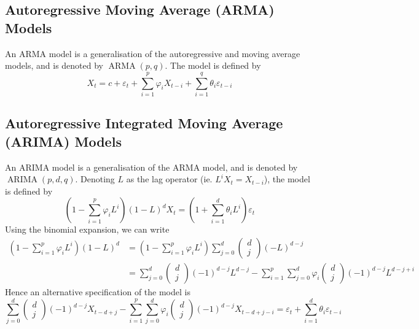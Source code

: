 \documentclass[11pt]{report} %
\begin{document}
\subsection{Autoregressive Moving Average (ARMA) Models}
An ARMA model is a generalisation of the autoregressive and moving average models, and is denoted by $\operatorname{ARMA}\left(p, q\right)$. The model is defined by
\begin{equation}
X_{t} = c + \varepsilon_{t} + \sum_{i = 1}^{p}\varphi_{i}X_{t - i} + \sum_{i = 1}^{q}\theta_{i}\varepsilon_{t - i}
\end{equation}

\subsection{Autoregressive Integrated Moving Average (ARIMA) Models}
An ARIMA model is a generalisation of the ARMA model, and is denoted by $\operatorname{ARIMA}\left(p, d, q\right)$. Denoting $L$ as the lag operator (ie. $L^{i}X_{t} = X_{t - i}$), the model is defined by
\begin{equation}
\left(1 - \sum_{i = 1}^{p}\varphi_{i}L^{i}\right)\left(1 - L\right)^{d}X_{t} = \left(1 + \sum_{i = 1}^{d}\theta_{i}L^{i}\right)\varepsilon_{t}
\end{equation}
Using the binomial expansion, we can write
\begin{align}
\left(1 - \sum_{i = 1}^{p}\varphi_{i}L^{i}\right)\left(1 - L\right)^{d} &= \left(1 - \sum_{i = 1}^{p}\varphi_{i}L^{i}\right)\sum_{j = 0}^{d} \begin{pmatrix}
d \\ j
\end{pmatrix} \left(-L\right)^{d - j}  \\
&= \sum_{j = 0}^{d} \begin{pmatrix}
d \\ j
\end{pmatrix} \left(-1\right)^{d - j}L^{d - j} - \sum_{i = 1}^{p}\sum_{j = 0}^{d}\varphi_{i}\begin{pmatrix}
d \\ j
\end{pmatrix}\left(-1\right)^{d- j}L^{d - j + i}
\end{align}
Hence an alternative specification of the model is
\begin{equation}
\sum_{j = 0}^{d} \begin{pmatrix}
d \\ j
\end{pmatrix} \left(-1\right)^{d - j}X_{t - d + j} - \sum_{i = 1}^{p}\sum_{j = 0}^{d}\varphi_{i}\begin{pmatrix}
d \\ j
\end{pmatrix}\left(-1\right)^{d- j}X_{t - d + j - i} = \varepsilon_{t} + \sum_{i = 1}^{d}\theta_{i}\varepsilon_{t - i}
\end{equation}
\end{document}
